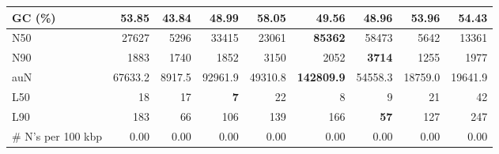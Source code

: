\documentclass[12pt,a4paper]{article}
\begin{document}
\begin{table}[ht]
\begin{center}
\begin{tabular}{|l*{8}{|r}|}
GC (\%) & 53.85 & 43.84 & 48.99 & 58.05 & 49.56 & 48.96 & 53.96 & 54.43 \\ \hline
N50 & 27627 & 5296 & 33415 & 23061 & {\bf 85362} & 58473 & 5642 & 13361 \\ \hline
N90 & 1883 & 1740 & 1852 & 3150 & 2052 & {\bf 3714} & 1255 & 1977 \\ \hline
auN & 67633.2 & 8917.5 & 92961.9 & 49310.8 & {\bf 142809.9} & 54558.3 & 18759.0 & 19641.9 \\ \hline
L50 & 18 & 17 & {\bf 7} & 22 & 8 & 9 & 21 & 42 \\ \hline
L90 & 183 & 66 & 106 & 139 & 166 & {\bf 57} & 127 & 247 \\ \hline
\# N's per 100 kbp & 0.00 & 0.00 & 0.00 & 0.00 & 0.00 & 0.00 & 0.00 & 0.00 \\ \hline
\end{tabular}
\end{center}
\end{table}
\end{document}
